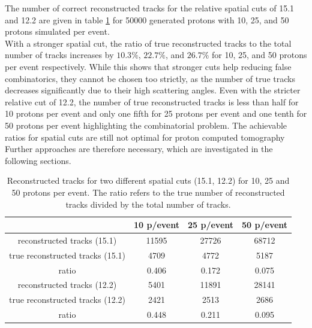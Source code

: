 The number of correct reconstructed tracks for the relative spatial cuts of 15.1 and 12.2 are given in table
\ref{tab:true_tracks} for 50000 generated protons with 10,
25, and 50 protons simulated per event. \\
With a stronger spatial cut,  the ratio of true reconstructed tracks to
the total number of tracks increases by $10.3\%$, $22.7\%$, and $26.7\%$ for 10, 25, and 50 protons per event respectively.
While this shows that stronger cuts help reducing false combinatorics, they cannot be chosen too strictly,
as the number of true tracks decreases significantly due to their high scattering angles. Even with the stricter relative cut of 12.2, the
number of true reconstructed tracks is less than half for 10 protons per event and only one fifth for 25 protons per event and one tenth for 50 protons per event highlighting
the combinatorial problem. The achievable ratios for spatial cuts are still not optimal for proton computed tomography
Further approaches are therefore necessary, which are investigated in the following sections.

\begin{table}
  \centering
  \begin{tabular}{c | c c c}
    \toprule
     & 10 p/event & 25 p/event & 50 p/event \\
    \midrule
    reconstructed tracks (15.1) & 11595 & 27726 & 68712  \\
    true reconstructed tracks (15.1) & 4709 & 4772  & 5187 \\
    ratio & 0.406 & 0.172 & 0.075 \\
    \midrule
    reconstructed tracks (12.2) & 5401 & 11891 & 28141 \\
    true reconstructed tracks (12.2) &  2421 &2513  & 2686 \\
    ratio & 0.448 & 0.211 & 0.095
  \end{tabular}
  \caption{Reconstructed tracks for two different spatial cuts (15.1, 12.2) for 10, 25 and 50 protons per event. The ratio refers to the true
  number of reconstructed tracks divided by the total number of tracks.}
  \label{tab:true_tracks}
\end{table}


